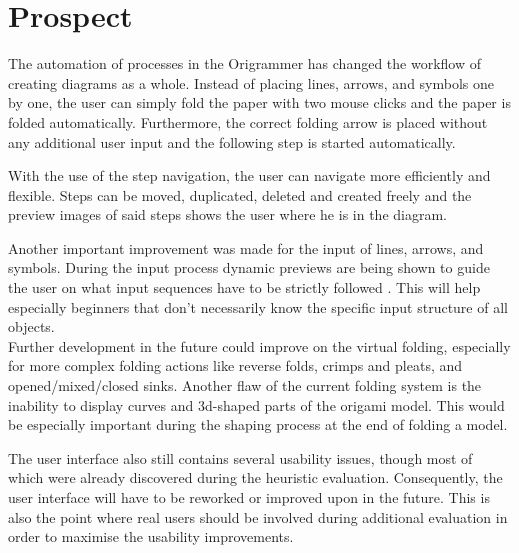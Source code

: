 
\section{Prospect}
\label{sec:prospect}

The automation of processes in the Origrammer has changed the workflow of creating diagrams as a whole. Instead of placing lines, arrows, and symbols one by one, the user can simply fold the paper with two mouse clicks and the paper is folded automatically. Furthermore, the correct folding arrow is placed without any additional user input and the following step is started automatically.

With the use of the step navigation, the user can navigate more efficiently and flexible. Steps can be moved, duplicated, deleted and created freely and the preview images of said steps shows the user where he is in the diagram.

Another important improvement was made for the input of lines, arrows, and symbols. During the input process dynamic previews are being shown to guide the user on what input sequences have to be strictly followed . This will help especially beginners that don't necessarily know the specific input structure of all objects.\\
\newline
Further development in the future could improve on the virtual folding, especially for more complex folding actions like reverse folds, crimps and pleats, and opened/mixed/closed sinks. Another flaw of the current folding system is the inability to display curves and 3d-shaped parts of the origami model. This would be especially important during the shaping process at the end of folding a model.

The user interface also still contains several usability issues, though most of which were already discovered during the heuristic evaluation. Consequently, the user interface will have to be reworked or improved upon in the future. This is also the point where real users should be involved during additional evaluation in order to maximise the usability improvements.